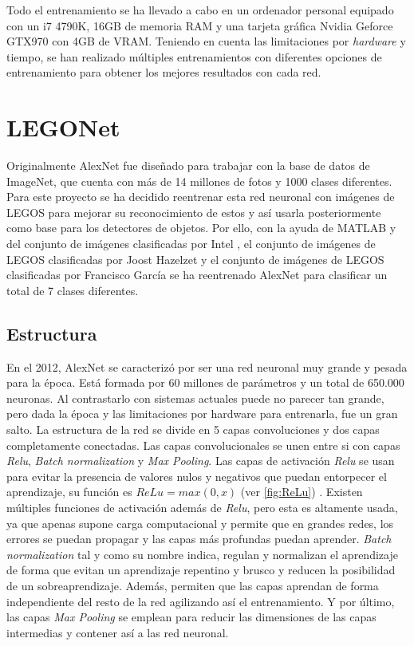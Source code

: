 Todo el entrenamiento se ha llevado a cabo en un ordenador personal equipado con un i7 4790K, 16GB de memoria RAM y una tarjeta gráfica Nvidia Geforce GTX970 con 4GB de VRAM. Teniendo en cuenta las limitaciones por \textit{hardware} y tiempo, se han realizado múltiples entrenamientos con diferentes opciones de entrenamiento para obtener los mejores resultados con cada red.

\section{LEGONet}
Originalmente AlexNet fue diseñado para trabajar con la base de datos de ImageNet, que cuenta con más de 14 millones de fotos y 1000 clases diferentes. Para este proyecto se ha decidido reentrenar esta red neuronal con imágenes de LEGOS para mejorar su reconocimiento de estos y así usarla posteriormente como base para los detectores de objetos. Por ello, con la ayuda de MATLAB y del conjunto de imágenes clasificadas por Intel \citep{IntelDataset}, el conjunto de imágenes de LEGOS clasificadas por Joost Hazelzet \citep{LEGODataset} y el conjunto de imágenes de LEGOS clasificadas por Francisco García \citep{LEGODataset2} se ha reentrenado AlexNet para clasificar un total de 7 clases diferentes.

\subsection{Estructura}
En el 2012, AlexNet se caracterizó por ser una red neuronal muy grande y pesada para la época. Está formada por 60 millones de parámetros y un total de 650.000 neuronas. Al contrastarlo con sistemas actuales puede no parecer tan grande, pero dada la época y las limitaciones por hardware para entrenarla, fue un gran salto. La estructura de la red se divide en 5 capas convoluciones y dos capas completamente conectadas. Las capas convolucionales se unen entre si con capas \textit{Relu}, \textit{Batch normalization} y \textit{Max Pooling}. Las capas de activación \textit{Relu} se usan para evitar la presencia de valores nulos y negativos que puedan entorpecer el aprendizaje, su función es $ReLu = max(0,x)$ (ver \autoref{fig:ReLu}) \citep{ReLu}. Existen múltiples funciones de activación además de \textit{Relu}, pero esta es altamente usada, ya que apenas supone carga computacional y permite que en grandes redes, los errores se puedan propagar y las capas más profundas puedan aprender. \textit{Batch normalization} tal y como su nombre indica, regulan  y normalizan el aprendizaje de forma que evitan un aprendizaje repentino y brusco y reducen la posibilidad de un sobreaprendizaje. Además, permiten que las capas aprendan de forma independiente del resto de la red agilizando así el entrenamiento. Y por último, las capas \textit{Max Pooling} se emplean para reducir las dimensiones de las capas intermedias y contener así a las red neuronal.

